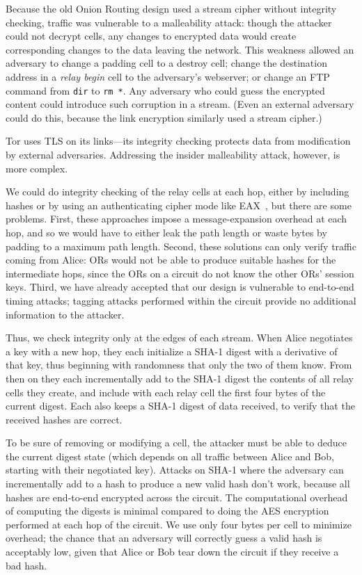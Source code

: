\documentclass[times,10pt,twocolumn]{article}
\begin{document}
\label{subsec:integrity-checking}

Because the old Onion Routing design used a stream cipher without integrity
checking, traffic was
vulnerable to a malleability attack: though the attacker could not
decrypt cells, any changes to encrypted data
would create corresponding changes to the data leaving the network.
This weakness allowed an adversary to change a padding cell to a destroy
cell; change the destination address in a \emph{relay begin} cell to the
adversary's webserver; or change an FTP command from
{\tt dir} to {\tt rm~*}. Any adversary who could guess the encrypted
content could introduce such corruption in a stream. (Even an external
adversary could do this, because the link encryption similarly used a
stream cipher.)

Tor uses TLS on its links---its integrity checking
protects data from modification by external adversaries.
Addressing the insider malleability attack, however, is
more complex.

We could do integrity checking of the relay cells at each hop, either
by including hashes or by using an authenticating cipher mode like
EAX~\cite{eax}, but there are some problems. First, these approaches
impose a message-expansion overhead at each hop, and so we would have to
either leak the path length or waste bytes by padding to a maximum
path length. Second, these solutions can only verify traffic coming
from Alice: ORs would not be able to produce suitable hashes for
the intermediate hops, since the ORs on a circuit do not know the
other ORs' session keys. Third, we have already accepted that our design
is vulnerable to end-to-end timing attacks; tagging attacks performed
within the circuit provide no additional information to the attacker.

Thus, we check integrity only at the edges of each stream. When Alice
negotiates a key with a new hop, they each initialize a SHA-1
digest with a derivative of that key,
thus beginning with randomness that only the two of them know. From
then on they each incrementally add to the SHA-1 digest the contents of
all relay cells they create, and include with each relay cell the
first four bytes of the current digest.  Each also keeps a SHA-1
digest of data received, to verify that the received hashes are correct.

To be sure of removing or modifying a cell, the attacker must be able
to deduce the current digest state (which depends on all
traffic between Alice and Bob, starting with their negotiated key).
Attacks on SHA-1 where the adversary can incrementally add to a hash
to produce a new valid hash don't work, because all hashes are
end-to-end encrypted across the circuit.  The computational overhead
of computing the digests is minimal compared to doing the AES
encryption performed at each hop of the circuit. We use only four
bytes per cell to minimize overhead; the chance that an adversary will
correctly guess a valid hash
is
acceptably low, given that Alice or Bob tear down the circuit if they
receive a bad hash.
\end{document}
